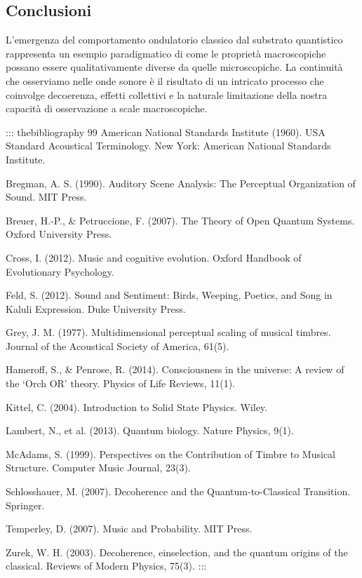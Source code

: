 \documentclass[a4paper,11pt]{article}
\begin{document}
\subsection{Conclusioni}\hypertarget{conclusioni}{}\label{conclusioni}

L'emergenza del comportamento ondulatorio classico dal substrato
quantistico rappresenta un esempio paradigmatico di come le proprietà
macroscopiche possano essere qualitativamente diverse da quelle
microscopiche. La continuità che osserviamo nelle onde sonore è il
risultato di un intricato processo che coinvolge decoerenza, effetti
collettivi e la naturale limitazione della nostra capacità di
osservazione a scale macroscopiche.

::: thebibliography
99 American National Standards Institute (1960). USA Standard Acoustical
Terminology. New York: American National Standards Institute.

Bregman, A. S. (1990). Auditory Scene Analysis: The Perceptual
Organization of Sound. MIT Press.

Breuer, H.-P., \& Petruccione, F. (2007). The Theory of Open Quantum
Systems. Oxford University Press.

Cross, I. (2012). Music and cognitive evolution. Oxford Handbook of
Evolutionary Psychology.

Feld, S. (2012). Sound and Sentiment: Birds, Weeping, Poetics, and Song
in Kaluli Expression. Duke University Press.

Grey, J. M. (1977). Multidimensional perceptual scaling of musical
timbres. Journal of the Acoustical Society of America, 61(5).

Hameroff, S., \& Penrose, R. (2014). Consciousness in the universe: A
review of the `Orch OR' theory. Physics of Life Reviews, 11(1).

Kittel, C. (2004). Introduction to Solid State Physics. Wiley.

Lambert, N., et al. (2013). Quantum biology. Nature Physics, 9(1).

McAdams, S. (1999). Perspectives on the Contribution of Timbre to
Musical Structure. Computer Music Journal, 23(3).

Schlosshauer, M. (2007). Decoherence and the Quantum-to-Classical
Transition. Springer.

Temperley, D. (2007). Music and Probability. MIT Press.

Zurek, W. H. (2003). Decoherence, einselection, and the quantum origins
of the classical. Reviews of Modern Physics, 75(3).
:::
\end{document}

